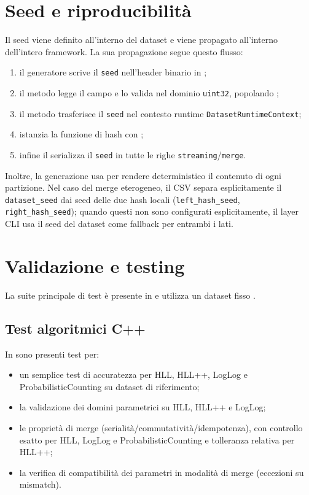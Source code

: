 \section{Seed e riproducibilità}
Il seed viene definito all'interno del dataset e viene propagato all'interno dell'intero framework.
La sua propagazione segue questo flusso:
\begin{enumerate}
    \item il generatore scrive il \texttt{seed} nell'header binario in
    ;
    \item il metodo  legge il campo e lo valida nel dominio
    \texttt{uint32}, popolando ;
    \item il metodo  trasferisce il 
    \texttt{seed} nel contesto runtime \texttt{DatasetRuntimeContext};
	    \item {} istanzia la funzione di hash con
	    ;
	    \item infine il  serializza il \texttt{seed} in tutte le righe
	    \texttt{streaming}/\texttt{merge}.
	\end{enumerate}

	Inoltre, la generazione usa 
	per rendere deterministico il contenuto di ogni partizione.
	Nel caso del merge eterogeneo, il CSV separa esplicitamente il
	\texttt{dataset\_seed} dai seed delle due hash locali
	(\texttt{left\_hash\_seed}, \texttt{right\_hash\_seed}); quando questi non
	sono configurati esplicitamente, il layer CLI usa il seed del dataset come
	fallback per entrambi i lati.

\section{Validazione e testing}

La suite principale di test è presente in  e utilizza un dataset fisso
.

\subsection{Test algoritmici C++}

In  sono presenti test per:
\begin{itemize}
    \item un semplice test di accuratezza per HLL, HLL++, LogLog e ProbabilisticCounting su dataset di riferimento;
    \item la validazione dei domini parametrici su HLL, HLL++ e LogLog;
    \item le proprietà di merge (serialità/commutatività/idempotenza), con controllo esatto per HLL, LogLog e ProbabilisticCounting e tolleranza relativa per HLL++;
    \item la verifica di compatibilità dei parametri in modalità di merge (eccezioni su mismatch).
\end{itemize}

